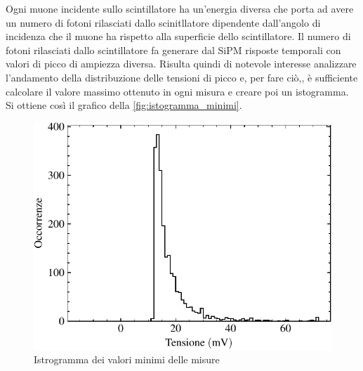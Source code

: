Ogni muone incidente sullo scintillatore ha un'energia diversa che porta ad avere un numero di fotoni rilasciati dallo scinitllatore 
dipendente dall'angolo di incidenza che il muone ha rispetto alla superficie dello scintillatore.
Il numero di fotoni rilasciati dallo scintillatore fa generare dal SiPM risposte temporali con valori di picco di ampiezza diversa.
Risulta quindi di notevole interesse analizzare l'andamento della distribuzione delle tensioni di picco e, per fare ciò,, è sufficiente calcolare il valore massimo
ottenuto in ogni misura e creare poi un istogramma. Si ottiene così il grafico della \autoref*{fig:istogramma_minimi}.
\begin{figure}[h!]
    \centering
    \includegraphics[width=.75\linewidth]{img/istogramma_minimi.pdf}
    \caption{Istrogramma dei valori minimi delle misure}
    \label{fig:istogramma_minimi}
\end{figure}

